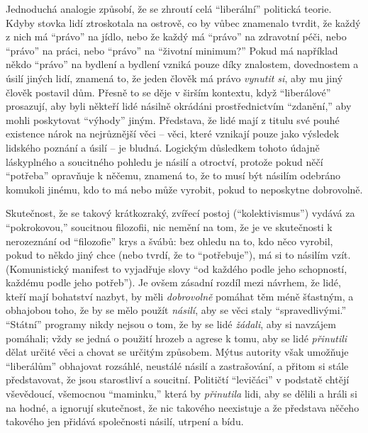 \documentclass{book}
\begin{document}
Jednoduchá analogie způsobí, že se zhroutí celá \enquote{liberální} politická teorie. Kdyby stovka lidí ztroskotala na ostrově, co by vůbec znamenalo tvrdit, že každý z nich má \enquote{právo} na jídlo, nebo že každý má \enquote{právo} na zdravotní péči, nebo \enquote{právo} na práci, nebo \enquote{právo} na \enquote{životní minimum?} Pokud má například někdo \enquote{právo} na bydlení a bydlení vzniká pouze díky znalostem, dovednostem a úsilí jiných lidí, znamená to, že jeden člověk má právo \emph{vynutit si}, aby mu jiný člověk postavil dům. Přesně to se děje v širším kontextu, když \enquote{liberálové} prosazují, aby byli někteří lidé násilně okrádáni prostřednictvím \enquote{zdanění,} aby mohli poskytovat \enquote{výhody} jiným. Představa, že lidé mají z titulu své pouhé existence nárok na nejrůznější věci -- věci, které vznikají pouze jako výsledek lidského poznání a úsilí -- je bludná. Logickým důsledkem tohoto údajně láskyplného a soucitného pohledu je násilí a otroctví, protože pokud něčí \enquote{potřeba} opravňuje k něčemu, znamená to, že to musí být násilím odebráno komukoli jinému, kdo to má nebo může vyrobit, pokud to neposkytne dobrovolně.

Skutečnost, že se takový krátkozraký, zvířecí postoj (\enquote{kolektivismus}) vydává za \enquote{pokrokovou,} soucitnou filozofii, nic nemění na tom, že je ve skutečnosti k nerozeznání od \enquote{filozofie} krys a švábů: bez ohledu na to, kdo něco vyrobil, pokud to někdo jiný chce (nebo tvrdí, že to \enquote{potřebuje}), má si to násilím vzít. (Komunistický manifest to vyjadřuje slovy \enquote{od každého podle jeho schopností, každému podle jeho potřeb}). Je ovšem zásadní rozdíl mezi návrhem, že lidé, kteří mají bohatství nazbyt, by měli \emph{dobrovolně} pomáhat těm méně šťastným, a obhajobou toho, že by se mělo použít \emph{násilí}, aby se věci staly \enquote{spravedlivými.} \enquote{Státní} programy nikdy nejsou o tom, že by se lidé \emph{žádali}, aby si navzájem pomáhali; vždy se jedná o použití hrozeb a agrese k tomu, aby se lidé \emph{přinutili} dělat určité věci a chovat se určitým způsobem. Mýtus autority však umožňuje \enquote{liberálům} obhajovat rozsáhlé, neustálé násilí a zastrašování, a přitom si stále představovat, že jsou starostliví a soucitní. Političtí \enquote{levičáci} v podstatě chtějí vševědoucí, všemocnou \enquote{maminku,} která by \emph{přinutila} lidi, aby se dělili a hráli si na hodné, a ignorují skutečnost, že nic takového neexistuje a že představa něčeho takového jen přidává společnosti násilí, utrpení a bídu.
\end{document}
